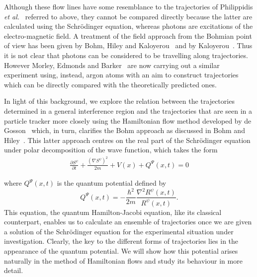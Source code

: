 \documentclass[12pt]{article}%
\begin{document}
Although these flow lines have some resemblance to the trajectories of
Philippidis \emph{et al.}~\cite{cpcdbh79} referred to above, they cannot be
compared directly because the latter are calculated using the Schr\"{o}dinger
equation, whereas photons are excitations of the electro-magnetic field. A
treatment of the field approach from the Bohmian point of view has been given
by Bohm, Hiley and Kaloyerou~\cite{dbbhpk87} and by Kaloyerou~\cite{pk94}.
Thus it is not clear that photons can be considered to be travelling along
trajectories. However Morley, Edmonds and Barker~\cite{jmjepb16} are now
carrying out a similar experiment using, instead, argon atoms with an aim to
construct trajectories which can be directly compared with the theoretically
predicted ones.

In light of this background, we explore the relation between the trajectories
determined in a general interference region and the trajectories that are seen
in a particle tracker more closely using the Hamiltonian flow method developed
by de Gosson~\cite{ICP} which, in turn, clarifies the Bohm approach as
discussed in Bohm and Hiley~\cite{BoHi}.
This latter approach centres on the real part of the Schr\"{o}dinger equation
under polar decomposition of the wave function, which takes the form
\begin{eqnarray}
\frac{\partial S^{\psi}}{\partial t}+\frac{(\nabla S^{\psi})^{2}}%
{2m}+V(x)+Q^{\Psi}(x,t)=0	\label{eq:QHJ}
\end{eqnarray}

where $Q^{\Psi}(x,t)$ is the quantum potential defined by
\[
Q^{\Psi}(x,t)=-\frac{\hbar^{2}}{2m}\frac{\nabla^{2}R^{\psi}(x,t)}{R^{\psi
}(x,t)}.
\]
This equation, the quantum Hamilton-Jacobi equation, like its classical
counterpart, enables us to calculate an ensemble of trajectories once we are
given a solution of the Schr\"{o}dinger equation for the experimental
situation under investigation. Clearly, the key to the different forms of
trajectories lies in the appearance of the quantum potential. We will show how
this potential arises naturally in the method of Hamiltonian flows and study
its behaviour in more detail.
\end{document}
